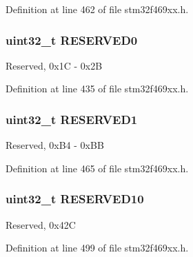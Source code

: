 Definition at line 462 of file stm32f469xx.\+h.

\subsubsection[{\texorpdfstring{R\+E\+S\+E\+R\+V\+E\+D0}{RESERVED0}}]{\setlength{\rightskip}{0pt plus 5cm}uint32\+\_\+t R\+E\+S\+E\+R\+V\+E\+D0}\hypertarget{struct_d_s_i___type_def_a5a51afd3eec34b9f5806b754eb0101a1}{}\label{struct_d_s_i___type_def_a5a51afd3eec34b9f5806b754eb0101a1}
Reserved, 0x1C -\/ 0x2B 

Definition at line 435 of file stm32f469xx.\+h.

\subsubsection[{\texorpdfstring{R\+E\+S\+E\+R\+V\+E\+D1}{RESERVED1}}]{\setlength{\rightskip}{0pt plus 5cm}uint32\+\_\+t R\+E\+S\+E\+R\+V\+E\+D1}\hypertarget{struct_d_s_i___type_def_a3c50f8698052818ea3024b4b52d65886}{}\label{struct_d_s_i___type_def_a3c50f8698052818ea3024b4b52d65886}
Reserved, 0x\+B4 -\/ 0x\+BB 

Definition at line 465 of file stm32f469xx.\+h.

\subsubsection[{\texorpdfstring{R\+E\+S\+E\+R\+V\+E\+D10}{RESERVED10}}]{\setlength{\rightskip}{0pt plus 5cm}uint32\+\_\+t R\+E\+S\+E\+R\+V\+E\+D10}\hypertarget{struct_d_s_i___type_def_a7c173f2fa5c4ef64aafebcccaebf05fd}{}\label{struct_d_s_i___type_def_a7c173f2fa5c4ef64aafebcccaebf05fd}
Reserved, 0x42C 

Definition at line 499 of file stm32f469xx.\+h.

